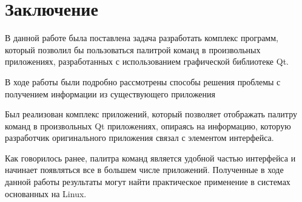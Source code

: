 \chapter*{Заключение}

В данной работе была поставлена задача разработать комплекс программ, который
позволил бы пользоваться палитрой команд в произвольных приложениях,
разработанных с использованием графической библиотеке Qt.

В ходе работы были подробно рассмотрены способы решения проблемы с получением
информации из существующего приложения

Был реализован комплекс приложений, который позволяет отображать палитру команд
в произвольных Qt приложениях, опираясь на информацию, которую разработчик
оригинального приложения связал с элементом интерфейса.

Как говорилось ранее, палитра команд является удобной частью интерфейса и
начинает появляться все в большем числе приложений. Полученные в ходе данной
работы результаты могут найти практическое применение в системах основанных на
Linux.
